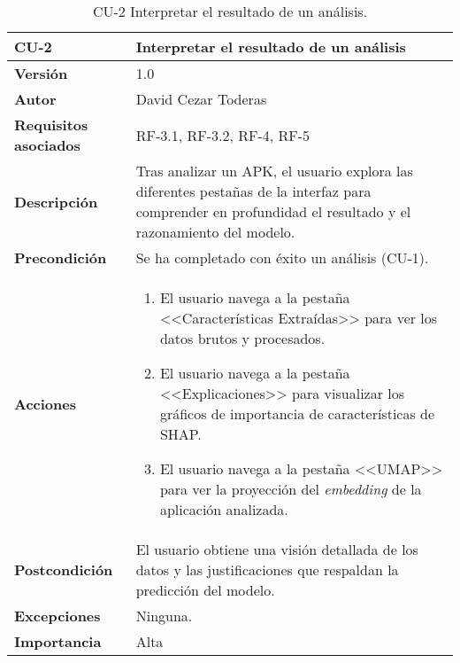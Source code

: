 \begin{table}[H]
	\centering
	\begin{tabularx}{\linewidth}{ p{} p{} }
		\toprule
		\textbf{CU-2}    & \textbf{Interpretar el resultado de un análisis}\\
		\toprule
		\textbf{Versión}              & 1.0    \\
		\textbf{Autor}                & David Cezar Toderas \\
		\textbf{Requisitos asociados} & RF-3.1, RF-3.2, RF-4, RF-5 \\
		\textbf{Descripción}          & Tras analizar un APK, el usuario explora las diferentes pestañas de la interfaz para comprender en profundidad el resultado y el razonamiento del modelo. \\
		\textbf{Precondición}         & Se ha completado con éxito un análisis (CU-1). \\
		\textbf{Acciones}             &
		\begin{enumerate}
			\def\labelenumi{\arabic{enumi}.}
			\tightlist
			\item El usuario navega a la pestaña <<Características Extraídas>> para ver los datos brutos y procesados.
			\item El usuario navega a la pestaña <<Explicaciones>> para visualizar los gráficos de importancia de características de SHAP.
			\item El usuario navega a la pestaña <<UMAP>> para ver la proyección del \textit{embedding} de la aplicación analizada.
		\end{enumerate}\\
		\textbf{Postcondición}        & El usuario obtiene una visión detallada de los datos y las justificaciones que respaldan la predicción del modelo. \\
		\textbf{Excepciones}          & Ninguna. \\
		\textbf{Importancia}          & Alta \\
		\bottomrule
	\end{tabularx}
	\caption{CU-2 Interpretar el resultado de un análisis.}
\end{table}

